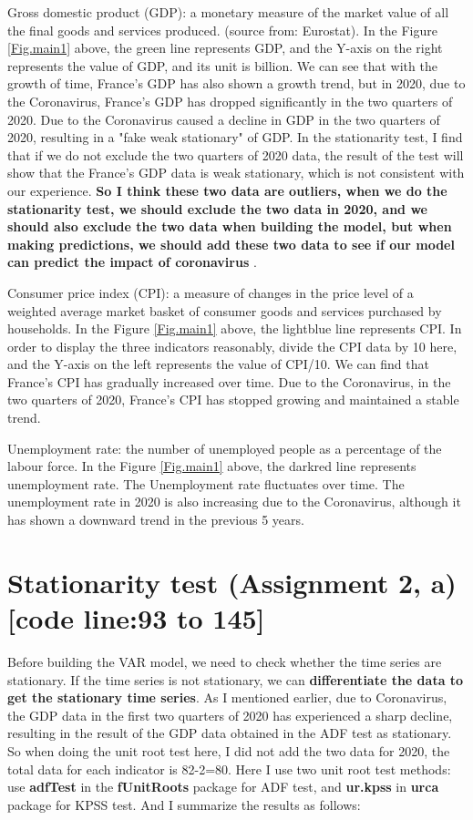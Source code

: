 \documentclass{report}
\begin{document}
Gross domestic product (GDP): a monetary measure of the market value of all the final goods and services produced. (source from: Eurostat). In the Figure \ref{Fig.main1} above, the green line represents GDP, and the Y-axis on the right represents the value of GDP, and its unit is billion. We can see that with the growth of time, France's GDP has also shown a growth trend, but in 2020, due to the Coronavirus, France's GDP has dropped significantly in the two quarters of 2020. Due to the Coronavirus caused a decline in GDP in the two quarters of 2020, resulting in a "fake weak stationary" of GDP.  In the stationarity test, I find that if we do not exclude the two quarters of 2020 data, the result of the test will show that the France's GDP data is weak stationary, which is not consistent with our experience. \textbf{So I think these two data are outliers, when we do the stationarity test, we should exclude the two data in 2020, and we should also exclude the two data when building the model, but when making predictions, we should add these two data to see if our model can predict the impact of coronavirus }.

Consumer price index (CPI): a measure of  changes in the price level of a weighted average market basket of consumer goods and services purchased by households. In the Figure \ref{Fig.main1} above, the lightblue line represents CPI. In order to display the three indicators reasonably, divide the CPI data by 10 here, and the Y-axis on the left represents the value of CPI/10. We can find that France’s CPI has gradually increased over time. Due to the Coronavirus, in the two quarters of 2020, France’s CPI has stopped growing and maintained a stable trend.

Unemployment rate: the number of unemployed people as a percentage of the labour force. In the Figure \ref{Fig.main1} above, the darkred line represents unemployment rate. The Unemployment rate fluctuates over time. The unemployment rate in 2020 is also increasing due to the Coronavirus, although it has shown a downward trend in the previous 5 years.




\section{Stationarity test (Assignment 2, a) [code line:93 to 145]}

Before building the VAR model, we need to check whether the time series are stationary. If the time series is not stationary, we can \textbf{differentiate the data to get the stationary time series}. As I mentioned earlier, due to Coronavirus, the GDP data in the first two quarters of 2020 has experienced a sharp decline, resulting in the result of the GDP data obtained in the ADF test as stationary. So when doing the unit root test here, I did not add the two data for 2020, the total data for each indicator is 82-2=80. Here I use two unit root test methods: use \textbf{adfTest}	 in the \textbf{fUnitRoots} package for ADF test, and \textbf{ur.kpss} in \textbf{urca} package for KPSS test. And I summarize the results as follows:
\end{document}
